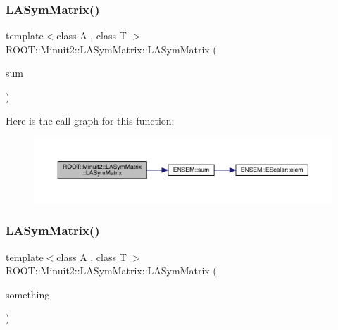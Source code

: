 \subsubsection{\texorpdfstring{LASymMatrix()}{LASymMatrix()}\hspace{0.1cm}{\footnotesize\ttfamily [5/20]}}
{\footnotesize\ttfamily template$<$class A , class T $>$ \\
R\+O\+O\+T\+::\+Minuit2\+::\+L\+A\+Sym\+Matrix\+::\+L\+A\+Sym\+Matrix (\begin{DoxyParamCaption}\item[{const \mbox{\hyperlink{classROOT_1_1Minuit2_1_1ABObj}{A\+B\+Obj}}$<$ \mbox{\hyperlink{classROOT_1_1Minuit2_1_1sym}{sym}}, \mbox{\hyperlink{classROOT_1_1Minuit2_1_1ABSum}{A\+B\+Sum}}$<$ \mbox{\hyperlink{classROOT_1_1Minuit2_1_1ABObj}{A\+B\+Obj}}$<$ \mbox{\hyperlink{classROOT_1_1Minuit2_1_1sym}{sym}}, \mbox{\hyperlink{classROOT_1_1Minuit2_1_1LASymMatrix}{L\+A\+Sym\+Matrix}}, T $>$, \mbox{\hyperlink{classROOT_1_1Minuit2_1_1ABObj}{A\+B\+Obj}}$<$ \mbox{\hyperlink{classROOT_1_1Minuit2_1_1sym}{sym}}, A, T $>$ $>$, T $>$ \&}]{sum }\end{DoxyParamCaption})\hspace{0.3cm}{\ttfamily [inline]}}

Here is the call graph for this function\+:
\nopagebreak
\begin{figure}[H]
\begin{center}
\leavevmode
\includegraphics[width=350pt]{d3/d72/classROOT_1_1Minuit2_1_1LASymMatrix_a252615373ae5ffe035baa9e8221e67e3_cgraph}
\end{center}
\end{figure}
\mbox{\label{classROOT_1_1Minuit2_1_1LASymMatrix_ac807736f91c64875cb01e13050a6c925}} 
\subsubsection{\texorpdfstring{LASymMatrix()}{LASymMatrix()}\hspace{0.1cm}{\footnotesize\ttfamily [6/20]}}
{\footnotesize\ttfamily template$<$class A , class T $>$ \\
R\+O\+O\+T\+::\+Minuit2\+::\+L\+A\+Sym\+Matrix\+::\+L\+A\+Sym\+Matrix (\begin{DoxyParamCaption}\item[{const \mbox{\hyperlink{classROOT_1_1Minuit2_1_1ABObj}{A\+B\+Obj}}$<$ \mbox{\hyperlink{classROOT_1_1Minuit2_1_1sym}{sym}}, \mbox{\hyperlink{classROOT_1_1Minuit2_1_1ABObj}{A\+B\+Obj}}$<$ \mbox{\hyperlink{classROOT_1_1Minuit2_1_1sym}{sym}}, A, T $>$, T $>$ \&}]{something }\end{DoxyParamCaption})\hspace{0.3cm}{\ttfamily [inline]}}

